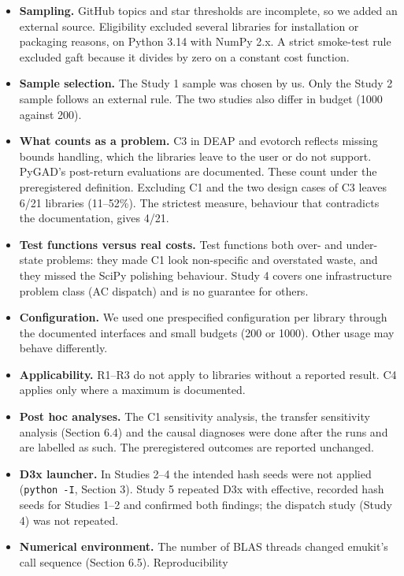 \documentclass[acmsmall,screen,review,anonymous=false]{acmart}
\providecommand{\tightlist}{\setlength{\itemsep}{0pt}\setlength{\parskip}{0pt}}
\begin{document}
\begin{itemize}
\tightlist
\item
  \textbf{Sampling.} GitHub topics and star thresholds are incomplete, so we added an external source. Eligibility
  excluded several libraries for installation or packaging reasons, on Python 3.14 with NumPy 2.x. A strict
  smoke-test rule excluded gaft because it divides by zero on a constant cost function.
\item
  \textbf{Sample selection.} The Study 1 sample was chosen by us. Only the Study 2 sample follows an external rule. The two
  studies also differ in budget (1000 against 200).
\item
  \textbf{What counts as a problem.} C3 in DEAP and evotorch reflects missing bounds handling, which the libraries leave to
  the user or do not support. PyGAD's post-return evaluations are documented. These count under the preregistered
  definition. Excluding C1 and the two design cases of C3 leaves 6/21 libraries (11--52\%). The strictest measure,
  behaviour that contradicts the documentation, gives 4/21.
\item
  \textbf{Test functions versus real costs.} Test functions both over- and under-state problems: they made C1 look
  non-specific and overstated waste, and they missed the SciPy polishing behaviour. Study 4 covers one infrastructure problem
  class (AC dispatch) and is no guarantee for others.
\item
  \textbf{Configuration.} We used one prespecified configuration per library through the documented interfaces and small budgets (200 or
  1000). Other usage may behave differently.
\item
  \textbf{Applicability.} R1--R3 do not apply to libraries without a reported result. C4 applies only where a maximum is
  documented.
\item
  \textbf{Post hoc analyses.} The C1 sensitivity analysis, the transfer sensitivity analysis (Section 6.4) and the causal
  diagnoses were done after the runs and are labelled as such. The preregistered outcomes are reported unchanged.
\item
  \textbf{D3x launcher.} In Studies 2--4 the intended hash seeds were not applied (\texttt{python\ -I}, Section 3). Study 5 repeated
  D3x with effective, recorded hash seeds for Studies 1--2 and confirmed both findings; the dispatch study (Study 4)
  was not repeated.
\item
  \textbf{Numerical environment.} The number of BLAS threads changed emukit's call sequence (Section 6.5). Reproducibility

\end{itemize}
\end{document}
